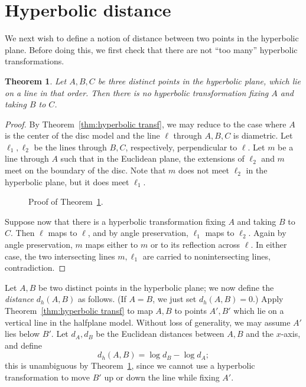 \documentclass[12pt]{book}
\numberwithin{exc}{section}
\numberwithin{figure}{section}
\newtheorem{theorem}{Theorem}[section]
\numberwithin{equation}{theorem}
\begin{document}
\section{Hyperbolic distance}

We next wish to define a notion of distance between two points
in the hyperbolic plane. Before doing this, we first check that there
are not ``too many'' hyperbolic transformations.
\begin{theorem} \label{thm:hyperbolic line}
Let $A,B,C$ be three distinct 
points in the hyperbolic plane, which lie on a line
in that order. Then there is no hyperbolic transformation fixing
$A$ and taking $B$ to $C$.
\end{theorem}
\begin{proof}
By Theorem~\ref{thm:hyperbolic transf}, we may reduce to the case
where $A$ is the center of the disc model and the line $\ell$
through $A,B,C$ is diametric. Let $\ell_1, \ell_2$ be the lines through $B,C$,
respectively, perpendicular to $\ell$. Let $m$ be a line through $A$
such that in the
Euclidean plane, the extensions of $\ell_2$ and $m$ meet on the boundary of the
disc. Note that $m$ does not meet $\ell_2$ in the hyperbolic plane, but it
does meet $\ell_1$.
\begin{figure}[ht]
\caption{Proof of Theorem~\ref{thm:hyperbolic line}.}
\end{figure}

Suppose now that there is a hyperbolic
transformation fixing $A$ and taking $B$ to $C$. Then $\ell$ maps to 
$\ell$, and by angle preservation, $\ell_1$ maps to $\ell_2$. Again by
angle preservation, $m$ maps either to $m$ or to its reflection across $\ell$.
In either case, the two intersecting lines $m, \ell_1$ are carried to 
nonintersecting lines, contradiction.
\end{proof}

Let $A,B$ be two distinct points in the hyperbolic plane; we now define
the \emph{distance} $d_h(A,B)$  as follows.
(If $A=B$, we just set $d_h(A,B) = 0$.)
Apply Theorem~\ref{thm:hyperbolic transf} to map $A,B$ to points
$A',B'$ which lie on a vertical line in the halfplane model. Without loss of
generality, we may assume $A'$ lies below $B'$. Let $d_A, d_B$ be the
Euclidean distances between $A,B$ and the $x$-axis, and define
\[
d_h(A,B) = \log d_B - \log d_A;
\]
this is unambiguous by Theorem~\ref{thm:hyperbolic line}, since we cannot use
a hyperbolic transformation to move $B'$ up or down the line while fixing
$A'$. 
\end{document}
